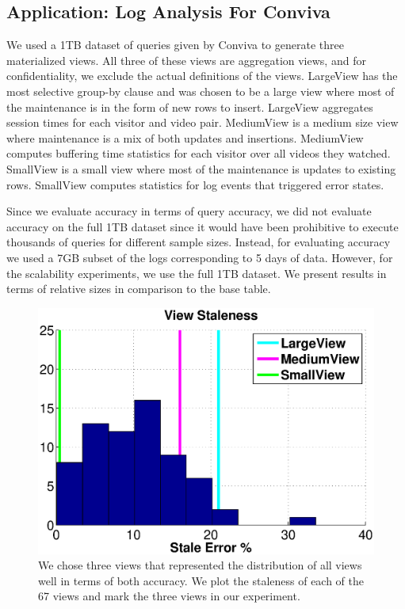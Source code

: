 \subsection{Application: Log Analysis For Conviva}
We used a 1TB dataset of queries given by Conviva to generate three materialized views.
All three of these views are aggregation views, and for confidentiality, we exclude the actual definitions of the views.
LargeView has the most selective group-by clause and was chosen to be a large view where most of the maintenance is in the form of new rows to insert.
LargeView aggregates session times for each visitor and video pair.
MediumView is a medium size view where maintenance is a mix of both updates and insertions.
MediumView computes buffering time statistics for each visitor over all videos they watched.
SmallView is a small view where most of the maintenance is updates to existing rows.
SmallView computes statistics for log events that triggered error states.

Since we evaluate accuracy in terms of query accuracy, we did not evaluate accuracy on the full 1TB dataset since it would have been prohibitive to execute thousands of queries for different sample sizes. 
Instead, for evaluating accuracy we used a 7GB subset of the logs corresponding to 5 days of data.
However, for the scalability experiments, we use the full 1TB dataset.
We present results in terms of relative sizes in comparison to the base table.

\begin{figure}[t]
\centering
\vspace{-0.75em}
\includegraphics[scale=0.23]{exp/conviva_efficiency_accuracy.eps}\vspace{-.5em}
 \caption{We chose three views that represented the distribution of all views well in terms of both accuracy. We plot the staleness of each of the 67 views and mark the three views in our experiment.\label{exp12conviva}}
\end{figure}

